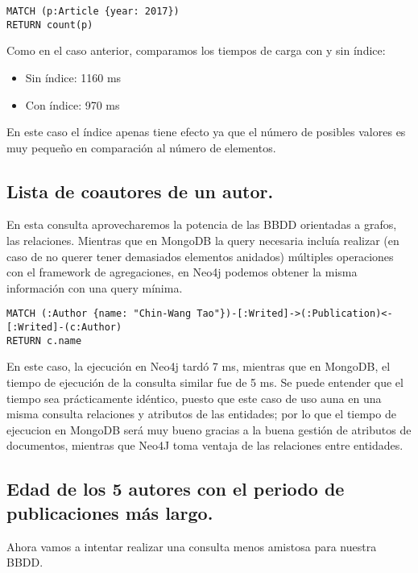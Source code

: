 \begin{verbatim}
MATCH (p:Article {year: 2017})
RETURN count(p)
\end{verbatim}

Como en el caso anterior, comparamos los tiempos de carga con y sin índice:

\begin{itemize}
 \item Sin índice: 1160 ms
 \item Con índice: 970 ms
\end{itemize}

En este caso el índice apenas tiene efecto ya que el número de posibles valores es muy pequeño en comparación al número de elementos.

\subsection{Lista de coautores de un autor.}

En esta consulta aprovecharemos la potencia de las \gls{BBDD} orientadas a grafos, las relaciones. Mientras que en MongoDB la query necesaria incluía realizar (en caso de no querer tener demasiados elementos anidados) múltiples operaciones con el framework de agregaciones, en Neo4j podemos obtener la misma información con una query mínima. 

\begin{verbatim}
MATCH (:Author {name: "Chin-Wang Tao"})-[:Writed]->(:Publication)<-[:Writed]-(c:Author)
RETURN c.name
\end{verbatim}

En este caso, la ejecución en Neo4j tardó 7 ms, mientras que en MongoDB, el tiempo de ejecución de la consulta similar fue de 5 ms. Se puede entender que el tiempo sea prácticamente idéntico, puesto que este caso de uso auna en una misma consulta relaciones y atributos de las entidades; por lo que el tiempo de ejecucion en MongoDB será muy bueno gracias a la buena gestión de atributos de documentos, mientras que Neo4J toma ventaja de las relaciones entre entidades.

\subsection{Edad de los 5 autores con el periodo de publicaciones más largo.}

Ahora vamos a intentar realizar una consulta menos amistosa para nuestra \gls{BBDD}.

